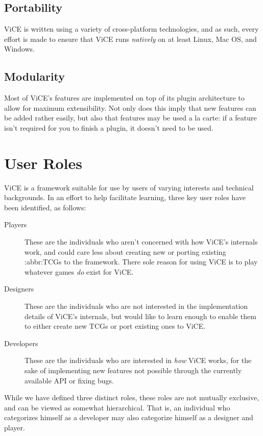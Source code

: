 \documentclass[letterpaper,10pt,english]{sphinxmanual}
\begin{document}
\chapter{Portability}
\label{index:portability}
ViCE is written using a variety of
cross-platform technologies, and as such, every effort is made to ensure that
ViCE runs \emph{natively} on at least Linux,
Mac OS, and Windows.


\chapter{Modularity}
\label{index:modularity}
Most of ViCE's features are implemented on top
of its plugin architecture to allow for maximum extensibility. Not only does
this imply that new features can be added rather easily, but also that features
may be used a la carte: if a feature isn't required for you to finish a plugin,
it doesn't need to be used.


\part{User Roles}
\label{index:user-roles}
ViCE is a framework suitable for use by users
of varying interests and technical backgrounds. In an effort to help facilitate
learning, three key user roles have been identified, as follows:
\begin{description}
\item[{Players}] \leavevmode
These are the individuals who aren't concerned with how
ViCE's internals work, and could care less
about creating new or porting existing :abbr:TCGs to
the framework. There sole reason for using
ViCE is to play whatever games \emph{do}
exist for ViCE.

\item[{Designers}] \leavevmode
These are the individuals who are not interested in the
implementation details of ViCE's internals,
but would like to learn enough to enable them to either create new TCGs or
port existing ones to ViCE.

\item[{Developers}] \leavevmode
These are the individuals who are interested in \emph{how}
ViCE works, for the sake of implementing
new features not possible through the currently available API or fixing bugs.

\end{description}

While we have defined three distinct roles, these roles are not mutually
exclusive, and can be viewed as somewhat hierarchical. That is, an individual
who categorizes himself as a developer may also categorize himself as a
designer and player.



\renewcommand{\indexname}{Index}
\printindex
\end{document}
